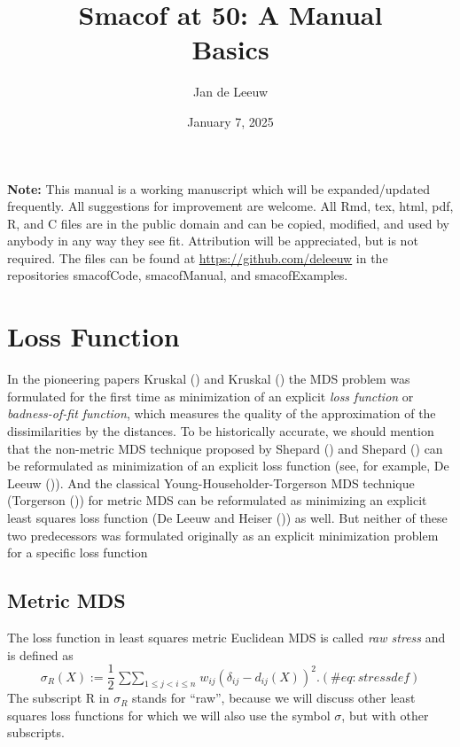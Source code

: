 \documentclass[
  12pt,
  letterpaper,
  DIV=11,
  numbers=noendperiod]{scrartcl}
\title{Smacof at 50: A Manual\\
Basics}
\author{Jan de Leeuw}
\date{January 7, 2025}
\newcommand{\sectionbreak}{\clearpage}
\renewcommand*\contentsname{Table of contents}
\newcommand\contentsname{Table of contents}
\theoremstyle{plain}
\theoremstyle{remark}
\begin{document}
\maketitle

\renewcommand*\contentsname{Table of contents}
{
\hypersetup{linkcolor=}
\setcounter{tocdepth}{3}
\tableofcontents
}

\textbf{Note:} This manual is a working manuscript which will be
expanded/updated frequently. All suggestions for improvement are
welcome. All Rmd, tex, html, pdf, R, and C files are in the public
domain and can be copied, modified, and used by anybody in any way they
see fit. Attribution will be appreciated, but is not required. The files
can be found at \url{https://github.com/deleeuw} in the repositories
smacofCode, smacofManual, and smacofExamples.

\sectionbreak

\section{Loss Function}\label{loss-function}

In the pioneering papers Kruskal () and
Kruskal () the MDS problem was
formulated for the first time as minimization of an explicit \emph{loss
function} or \emph{badness-of-fit function}, which measures the quality
of the approximation of the dissimilarities by the distances. To be
historically accurate, we should mention that the non-metric MDS
technique proposed by Shepard () and
Shepard () can be reformulated as
minimization of an explicit loss function (see, for example, De Leeuw
()). And the classical
Young-Householder-Torgerson MDS technique (Torgerson
()) for metric MDS can be reformulated
as minimizing an explicit least squares loss function (De Leeuw and
Heiser ()) as well. But neither
of these two predecessors was formulated originally as an explicit
minimization problem for a specific loss function

\subsection{Metric MDS}\label{metric-mds}

The loss function in least squares metric Euclidean MDS is called
\emph{raw stress} and is defined as \begin{equation}
\sigma_R(X):=\frac12\mathop{\sum\sum}_{1\leq j<i\leq n}w_{ij}(\delta_{ij}-d_{ij}(X))^2.
(\#eq:stressdef)
\end{equation} The subscript R in \(\sigma_R\) stands for ``raw'',
because we will discuss other least squares loss functions for which we
will also use the symbol \(\sigma\), but with other subscripts.
\end{document}
